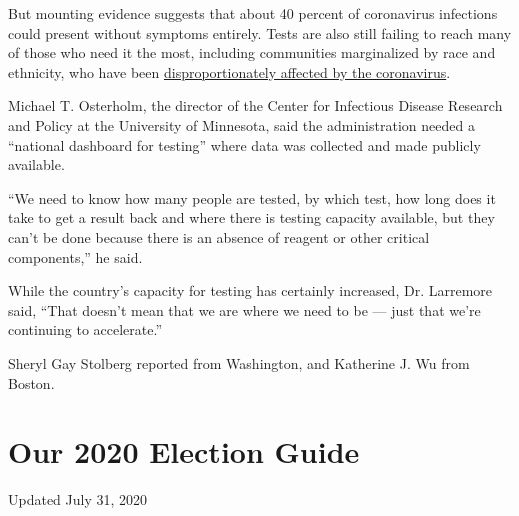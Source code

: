 But mounting evidence suggests that about 40 percent of coronavirus
infections could present without symptoms entirely. Tests are also still
failing to reach many of those who need it the most, including
communities marginalized by race and ethnicity, who have been
\href{https://www.nytimes3xbfgragh.onion/interactive/2020/07/05/us/coronavirus-latinos-african-americans-cdc-data.html}{disproportionately
affected by the coronavirus}.

Michael T. Osterholm, the director of the Center for Infectious Disease
Research and Policy at the University of Minnesota, said the
administration needed a ``national dashboard for testing'' where data
was collected and made publicly available.

``We need to know how many people are tested, by which test, how long
does it take to get a result back and where there is testing capacity
available, but they can't be done because there is an absence of reagent
or other critical components,'' he said.

While the country's capacity for testing has certainly increased, Dr.
Larremore said, ``That doesn't mean that we are where we need to be ---
just that we're continuing to accelerate.''

Sheryl Gay Stolberg reported from Washington, and Katherine J. Wu from
Boston.

\hypertarget{our-2020-election-guide}{%
\section{Our 2020 Election Guide}\label{our-2020-election-guide}}

Updated July 31, 2020

